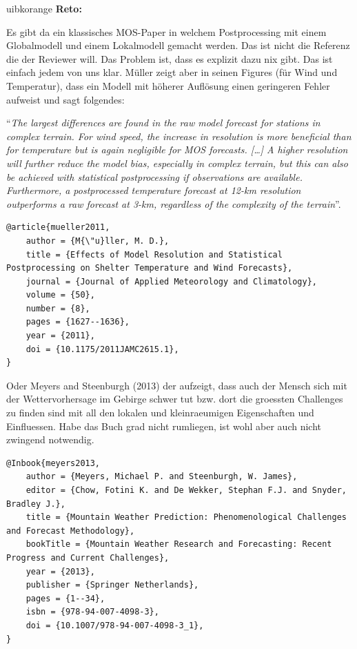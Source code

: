 \documentclass[american,foldmarks=false,noconfig]{uibklttr}
\newenvironment{reto}{
    \begin{color}{uibkorange}
    \textbf{Reto:~}
        \itshape
}{
    \end{color}
}
\begin{document}
\begin{reto}
Es gibt da ein klassisches MOS-Paper in welchem Postprocessing
mit einem Globalmodell und einem Lokalmodell gemacht werden.
Das ist nicht die Referenz die der Reviewer will.
Das Problem ist, dass es explizit dazu nix gibt. Das ist einfach
jedem von uns klar. M\"uller zeigt aber in seinen Figures (f\"ur
Wind und Temperatur), dass ein Modell mit h\"oherer Aufl\"osung
einen geringeren Fehler aufweist und sagt folgendes:

``\textit{The largest differences are found in the raw
model forecast for stations in complex terrain. For wind
speed, the increase in resolution is more beneficial than
for temperature but is again negligible for MOS forecasts.
[\dots]
A higher resolution will
further reduce the model bias, especially in complex
terrain, but this can also be achieved with statistical
postprocessing if observations are available. Furthermore,
a postprocessed temperature forecast at 12-km
resolution outperforms a raw forecast at 3-km, regardless
of the complexity of the terrain}''.

\begin{verbatim}
@article{mueller2011,
    author = {M{\"u}ller, M. D.},
    title = {Effects of Model Resolution and Statistical Postprocessing on Shelter Temperature and Wind Forecasts},
    journal = {Journal of Applied Meteorology and Climatology},
    volume = {50},
    number = {8},
    pages = {1627--1636},
    year = {2011},
    doi = {10.1175/2011JAMC2615.1},
}
\end{verbatim}

Oder Meyers and Steenburgh (2013) der aufzeigt, dass auch der Mensch sich mit
der Wettervorhersage im Gebirge schwer tut bzw. dort die groessten Challenges
zu finden sind mit all den lokalen und kleinraeumigen Eigenschaften und Einfluessen.
Habe das Buch grad nicht rumliegen, ist wohl aber auch nicht zwingend notwendig.

\begin{verbatim}
@Inbook{meyers2013,
    author = {Meyers, Michael P. and Steenburgh, W. James},
    editor = {Chow, Fotini K. and De Wekker, Stephan F.J. and Snyder, Bradley J.},
    title = {Mountain Weather Prediction: Phenomenological Challenges and Forecast Methodology},
    bookTitle = {Mountain Weather Research and Forecasting: Recent Progress and Current Challenges},
    year = {2013},
    publisher = {Springer Netherlands},
    pages = {1--34},
    isbn = {978-94-007-4098-3},
    doi = {10.1007/978-94-007-4098-3_1},
}
\end{verbatim}
\end{reto}
\end{document}
